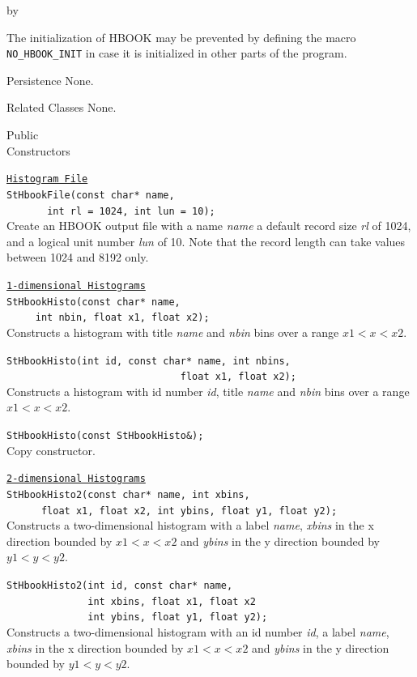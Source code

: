 \documentclass[twoside]{article}
\newcommand{\comp}[1]{\texttt{#1}}%
\newcommand{\entrylabel}[1]{\mbox{\textbf{{#1}}}\hfil}%
\newenvironment{entry}
{\begin{list}{}%
    {\renewcommand{\makelabel}{\entrylabel}%
     \setlength{\labelwidth}{90pt}%
     \setlength{\leftmargin}{\labelwidth}
     \advance\leftmargin by \labelsep%
      }%
    }%
  {\end{list}}
\newcommand{\Entrylabel}[1]%
{\raisebox{0pt}[1ex][0pt]{\makebox[\labelwidth][l]%
    {\parbox[t]{\labelwidth}{\hspace{0pt}\textbf{{#1}}}}}}
\newenvironment{Entry}%
{\renewcommand{\entrylabel}{\Entrylabel}\begin{entry}}%
  {\end{entry}}
\begin{document}
\begin{description}
\begin{Entry}
  The initialization of HBOOK may be prevented by defining
  the macro \texttt{NO\_\-HBOOK\-\_INIT} in case it is initialized
  in other parts of the program.

\item[Persistence]
  None.

\item[Related Classes]
  None.
  
\item[Public\\ Constructors]

  \comp{\underline{Histogram File}} \\
  \verb+StHbookFile(const char* name,+\\
  \verb+       int rl = 1024, int lun = 10);+\\
  Create an HBOOK output file with a name {\em name} a default
  record size {\em rl} of 1024, and a logical unit number {\em lun} of 10.
  Note that the record length can take values between 1024 and 8192 only.
  
  \comp{\underline{1-dimensional Histograms}} \\
  \verb+StHbookHisto(const char* name, +\\
  \verb+     int nbin, float x1, float x2);+ \\
  Constructs a histogram with title {\em name} and {\em nbin} bins over
  a range $x1 < x < x2$.

  \verb+StHbookHisto(int id, const char* name, int nbins,+\\
  \verb+                              float x1, float x2);+ \\
  Constructs a histogram with id number {\em id}, title {\em name}
  and {\em nbin} bins over a range $x1 < x < x2$.

  \verb+StHbookHisto(const StHbookHisto&);+\\
  Copy constructor.


  \comp{\underline{2-dimensional Histograms}} \\
  \verb+StHbookHisto2(const char* name, int xbins,+\\
  \verb+      float x1, float x2, int ybins, float y1, float y2);+ \\
  Constructs a two-dimensional histogram with a label {\em name},
  {\em xbins} in the x direction bounded by $x1 < x < x2$ and
  {\em ybins} in the y direction bounded by $y1 < y < y2$.

  \verb+StHbookHisto2(int id, const char* name, +\\
  \verb+              int xbins, float x1, float x2 +\\
  \verb+              int ybins, float y1, float y2); +\\
  Constructs a two-dimensional histogram with an id number {\em id},
  a label {\em name},
  {\em xbins} in the x direction bounded by $x1 < x < x2$ and
  {\em ybins} in the y direction bounded by $y1 < y < y2$.


\end{Entry}
\end{description}
\end{document}
